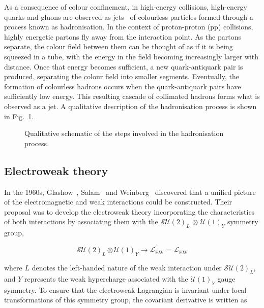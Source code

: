 As a consequence of colour confinement, in high-energy collisions, high-energy quarks and gluons are observed as jets~\cite{Hadronisation_Jets} of colourless particles formed through a process known as hadronisation. In the context of proton-proton (pp) collisions, highly energetic partons fly away from the interaction point. As the partons separate, the colour field between them can be thought of as if it is being squeezed in a tube, with the energy in the field becoming increasingly larger with distance. Once that energy becomes sufficient, a new quark-antiquark pair is produced, separating the colour field into smaller segments. Eventually, the formation of colourless hadrons occurs when the quark-antiquark pairs have sufficiently low energy. This resulting cascade of collimated hadrons forms what is observed as a jet. A qualitative description of the hadronisation process is shown in Fig.~\ref{Figure:Introduction_ColourConfinement}.

\begin{figure}[h]
    \centering
    
    \caption{Qualitative schematic of the steps involved in the hadronisation process.}
    \label{Figure:Introduction_ColourConfinement}
\end{figure}

\subsection{Electroweak theory}

In the 1960s, Glashow~\cite{Glashow_1}, Salam~\cite{Salam_1} and Weinberg~\cite{Weinberg_1} discovered that a unified picture of the electromagnetic and weak interactions could be constructed. Their proposal was to develop the electroweak theory incorporating the characteristics of both interactions by associating them with the $\mathcal{SU}(2)_{L}$ $\otimes$ $\mathcal{U(1)}_{Y}$ symmetry group,

\begin{equation}
    \mathcal{SU}(2)_L \otimes \mathcal{U}(1)_Y \rightarrow \mathcal{L}^{\prime}_{\text{EW}} = \mathcal{L}_{\text{EW}}
\end{equation}

where $L$ denotes the left-handed nature of the weak interaction under $\mathcal{SU}(2)_L$, and $Y$ represents the weak hypercharge associated with the $\mathcal{U}(1)_Y$ gauge symmetry. To ensure that the electroweak Lagrangian is invariant under local transformations of this symmetry group, the covariant derivative is written as

